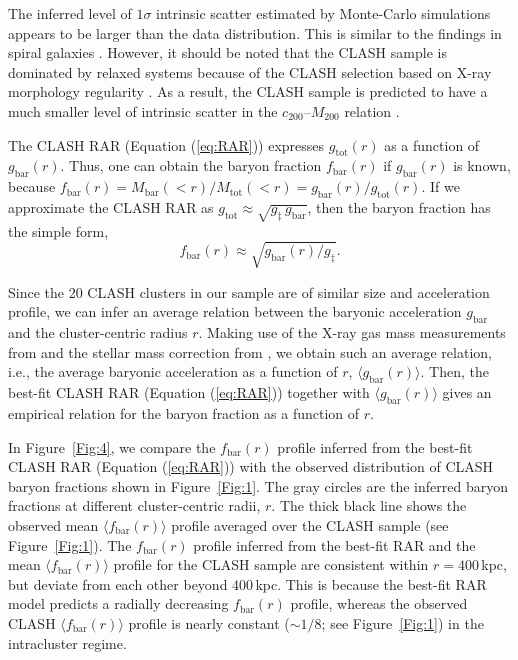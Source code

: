 \documentclass[a4paper,iop,twocolumn,twocolappendix,numberedappendix,appendixfloats]{emulateapj}
\newcommand{\percent}{\ensuremath{\%}}
\newcommand{\Mtot}{M_\mathrm{tot}}
\newcommand{\Mbar}{M_\mathrm{bar}}
\newcommand{\gbar}{g_\mathrm{bar}}
\newcommand{\gtot}{g_\mathrm{tot}}
\newcommand{\fbar}{f_\mathrm{bar}}
\begin{document}
The inferred level of $1\sigma$ intrinsic scatter estimated by
Monte-Carlo simulations appears to be larger than the data
distribution.
This is similar to the findings in spiral galaxies \citep[see,
e.g.,][]{DL16, Desmond17, Lelli17}.
However, it should be noted that the CLASH sample is
dominated by relaxed systems \citep{Meneghetti14}
because of the CLASH selection based on X-ray morphology
regularity \citep{Postman12}. As a result, the CLASH sample is predicted
to have a much smaller level of intrinsic scatter in the
$c_{200}$--$M_{200}$ relation \citep[$16\percent$;][]{Meneghetti14,Umetsu16}.

The CLASH RAR (Equation (\ref{eq:RAR})) expresses $\gtot(r)$ as a
function of $\gbar(r)$.
Thus, one can obtain the baryon fraction $\fbar(r)$ if $\gbar(r)$ is
known, because $\fbar(r)=\Mbar(<r)/\Mtot(<r)=\gbar(r)/\gtot(r)$.
If we approximate the CLASH RAR as $\gtot\approx\sqrt{g_\ddag\,\gbar}$,
then the baryon fraction has the simple form,
\begin{equation}
 \label{eq:fbar_gbar}
 \fbar(r)\approx\sqrt{\gbar(r)/g_\ddag}.
\end{equation}

Since the 20 CLASH clusters in our sample are of similar size and
acceleration profile, we can infer an average relation between the
baryonic acceleration $\gbar$ and the cluster-centric radius $r$.
Making use of the X-ray gas mass measurements from \citet{Donahue14} and the
stellar mass correction from \citet{Chiu18},
we obtain such an average relation, i.e., the average baryonic
acceleration as a function of $r$, $\langle\gbar(r)\rangle$.
Then, the best-fit CLASH RAR (Equation (\ref{eq:RAR})) together with
$\langle\gbar(r)\rangle$
gives an empirical relation for the baryon fraction as a function of
$r$.

In Figure~\ref{Fig:4}, we compare the $\fbar(r)$ profile inferred from
the best-fit CLASH RAR (Equation (\ref{eq:RAR})) with the observed
distribution of CLASH baryon fractions shown in Figure~\ref{Fig:1}.
The gray circles are the inferred baryon fractions at different
cluster-centric radii, $r$.
The thick black line shows the observed mean $\langle\fbar(r)\rangle$
profile averaged over the CLASH sample (see Figure~\ref{Fig:1}).
The $\fbar(r)$ profile inferred from the best-fit RAR and
the mean $\langle\fbar(r)\rangle$ profile for the CLASH sample
are consistent within $r=400$\,kpc, but deviate from each other beyond
$400$\,kpc.
This is because the best-fit RAR model predicts a radially
decreasing $\fbar(r)$ profile, whereas the observed CLASH
$\langle\fbar(r)\rangle$ profile is nearly constant ($\sim 1/8$; see
Figure~\ref{Fig:1}) in the intracluster regime.
\end{document}
